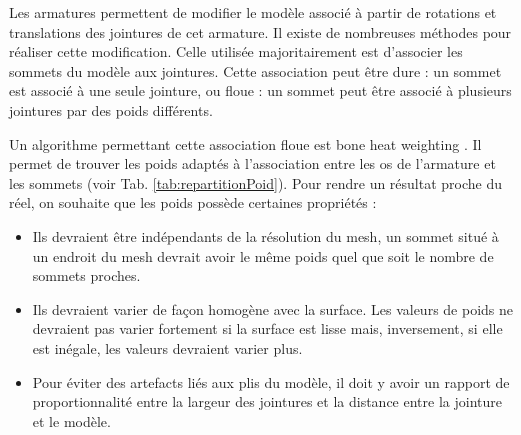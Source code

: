 Les armatures permettent de modifier le modèle associé à partir de rotations et translations des jointures de cet armature.
Il existe de nombreuses méthodes pour réaliser cette modification.
Celle utilisée majoritairement est d'associer les sommets du modèle aux jointures.
Cette association peut être dure : un sommet est associé à une seule jointure, ou floue : un sommet peut être associé à plusieurs jointures par des poids différents.\newline

Un algorithme permettant cette association floue est \og bone heat weighting \fg \cite{baran2007automatic}. 
Il permet de trouver les poids adaptés à l'association entre les os de l'armature et les sommets (voir Tab. \ref{tab:repartitionPoid}). Pour rendre un résultat proche du réel, on souhaite que les poids possède certaines propriétés : \\
\begin{itemize}
	\item Ils devraient être indépendants de la résolution du mesh, un sommet situé à un endroit du mesh devrait avoir le même poids quel
	que soit le nombre de sommets proches.
	\item Ils devraient varier de façon homogène avec la surface. Les valeurs de poids ne devraient pas varier fortement si la surface est lisse mais, inversement, si elle est inégale, les valeurs devraient varier plus.
	\item Pour éviter des artefacts liés aux plis du modèle, il doit y avoir un rapport de proportionnalité entre la largeur des jointures
	et la distance entre la jointure et le modèle.
\end{itemize}
